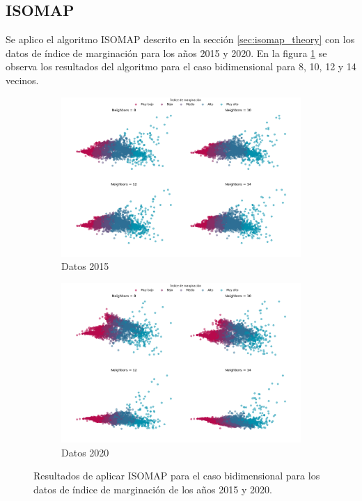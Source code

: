 \subsection{ISOMAP}

Se aplico el algoritmo ISOMAP descrito en la sección \ref{sec:isomap_theory} con los datos de índice de marginación para los años 2015 y 2020. En la figura \ref{fig:isompa_2d} se observa los resultados del algoritmo para el caso bidimensional para 8, 10, 12 y 14 vecinos.

\begin{figure}[H]
    \centering
    \begin{subfigure}{8.4cm}
        \includegraphics[width=1\linewidth]{Graphics/Data_2015/ISOMAP_2D.png}
        \caption{Datos 2015}
    \end{subfigure}
    \begin{subfigure}{8.4cm}
        \includegraphics[width=1\linewidth]{Graphics/Data_2020/ISOMAP_2D.png}
        \caption{Datos 2020}
    \end{subfigure}
    \caption{Resultados de aplicar ISOMAP para el caso bidimensional para los datos de índice de marginación de los años 2015 y 2020.}
    \label{fig:isompa_2d}
\end{figure}

